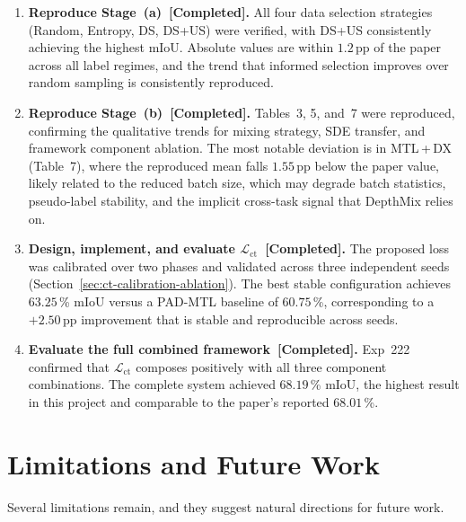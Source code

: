 \documentclass[
  oneside,
  author={Shijie Lu},
  degree={BSc},
  title={Label-Efficient Semantic Segmentation via Self-Supervised Depth Estimation and Cross-Task Consistency},
  unit={COMS30045},
  subtitle={}
]{dissertation}
\begin{document}
\begin{enumerate}

\item \textbf{Reproduce Stage~(a)~[Completed].}
  All four data selection strategies (Random, Entropy, DS, DS+US) were
  verified, with DS+US consistently achieving the highest mIoU.
  Absolute values are within $1.2$\,pp of the paper across all label
  regimes, and the trend that informed selection improves over random
  sampling is consistently reproduced.

\item \textbf{Reproduce Stage~(b)~[Completed].}
  Tables~3, 5, and~7 were reproduced, confirming the qualitative trends
  for mixing strategy, SDE transfer, and framework component ablation.
  The most notable deviation is in MTL\,+\,DX (Table~7), where the
  reproduced mean falls $1.55$\,pp below the paper value, likely related
  to the reduced batch size, which may degrade batch statistics,
  pseudo-label stability, and the implicit cross-task signal that
  DepthMix relies on.

\item \textbf{Design, implement, and evaluate
  $\mathcal{L}_\text{ct}$~[Completed].}
  The proposed loss was calibrated over two phases and validated across
  three independent seeds (Section~\ref{sec:ct-calibration-ablation}).
  The best stable configuration achieves $63.25$\,\% mIoU versus a
  PAD-MTL baseline of $60.75$\,\%, corresponding to a $+2.50$\,pp
  improvement that is stable and reproducible across seeds.

\item \textbf{Evaluate the full combined framework~[Completed].}
  Exp~222 confirmed that $\mathcal{L}_\text{ct}$ composes positively
  with all three component combinations. The complete system achieved
  $68.19$\,\% mIoU, the highest result in this project and comparable
  to the paper's reported $68.01$\,\%.

\end{enumerate}

\section{Limitations and Future Work}

\noindent
Several limitations remain, and they suggest natural directions for
future work.
\end{document}
